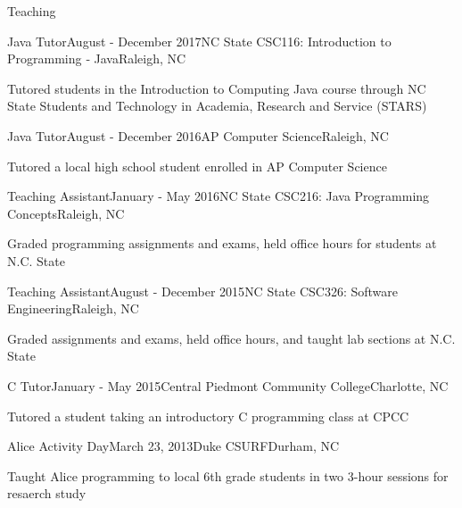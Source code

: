 \documentclass{resume} %
\begin{document}
\begin{rSection}{Teaching}

\begin{rSubsection}{Java Tutor}{August - December 2017}{NC State CSC116: Introduction to Programming ‐ Java}{Raleigh, NC}
\item Tutored students in the Introduction to Computing Java course through NC State Students and Technology in Academia, Research and Service (STARS)
\end{rSubsection}


\begin{rSubsection}{Java Tutor}{August - December 2016}{AP Computer Science}{Raleigh, NC}
\item Tutored a local high school student enrolled in AP Computer Science 
\end{rSubsection}


\begin{rSubsection}{Teaching Assistant}{January - May 2016}{NC State CSC216: Java Programming Concepts}{Raleigh, NC}
\item Graded programming assignments and exams, held office hours for students  at N.C. State
\end{rSubsection}


\begin{rSubsection}{Teaching Assistant}{August - December 2015}{NC State CSC326: Software Engineering}{Raleigh, NC}
\item Graded assignments and exams, held office hours, and taught lab sections  at N.C. State
\end{rSubsection}


\begin{rSubsection}{C Tutor}{January - May 2015}{Central Piedmont Community College}{Charlotte, NC}
\item Tutored a student taking an introductory C programming class at CPCC
\end{rSubsection}


\begin{rSubsection}{Alice Activity Day}{March 23, 2013}{Duke CSURF}{Durham, NC}
\item Taught Alice programming to local 6th grade students in two 3-hour sessions for resaerch study
\end{rSubsection}



\end{rSection}
\end{document}

